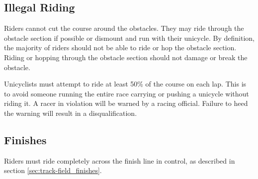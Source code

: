 \subsection{Illegal Riding}

Riders cannot cut the course around the obstacles.
They may ride through the obstacle section if possible or dismount and run with their unicycle.
By definition, the majority of riders should not be able to ride or hop the obstacle section.
Riding or hopping through the obstacle section should not damage or break the obstacle.

Unicyclists must attempt to ride at least 50\% of the course on each lap.
This is to avoid someone running the entire race carrying or pushing a unicycle without riding it. 
A racer in violation will be warned by a racing official.
Failure to heed the warning will result in a disqualification.

\subsection{Finishes}

Riders must ride completely across the finish line in control, as described in section \ref{sec:track-field_finishes}.
